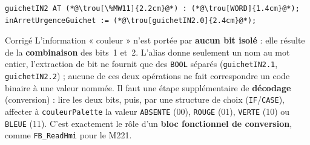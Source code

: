 \begin{UPSTIactivite}

\begin{lstlisting}
guichetIN2 AT (*@\trou[\%MW11]{2.2cm}@*) : (*@\trou[WORD]{1.4cm}@*);
inArretUrgenceGuichet := (*@\trou[guichetIN2.0]{2.4cm}@*);
\end{lstlisting}


\begin{UPSTIcorrectionP}{Corrigé}
L'information « couleur » n'est portée par \textbf{aucun bit isolé} : elle
résulte de la \textbf{combinaison} des bits~1 et~2. L'alias donne seulement
un nom au mot entier, l'extraction de bit ne fournit que des
\texttt{BOOL} séparés (\texttt{guichetIN2.1}, \texttt{guichetIN2.2}) ;
aucune de ces deux opérations ne fait correspondre un code binaire à une
valeur nommée. Il faut une étape supplémentaire de \textbf{décodage}
(conversion) : lire les deux bits, puis, par une structure de choix
(\texttt{IF}/\texttt{CASE}), affecter à \texttt{couleurPalette} la valeur
\texttt{ABSENTE} (00), \texttt{ROUGE} (01), \texttt{VERTE} (10) ou
\texttt{BLEUE} (11). C'est exactement le rôle d'un \textbf{bloc fonctionnel
de conversion}, comme \texttt{FB\_ReadHmi} pour le M221.
\end{UPSTIcorrectionP}
\end{UPSTIactivite}
